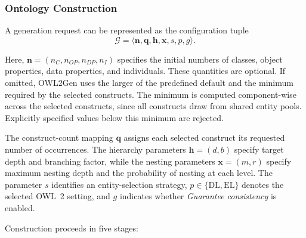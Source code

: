 \subsubsection{Ontology Construction}
\label{sec:owl2gendl}

A generation request can be represented as the configuration tuple
\[
\mathcal{G}
=
\langle \mathbf{n},\mathbf{q},\mathbf{h},\mathbf{x},s,p,g\rangle .
\]

Here, $\mathbf{n}=(n_C,n_{OP},n_{DP},n_I)$ specifies the initial numbers
of classes, object properties, data properties, and individuals. These
quantities are optional. If omitted, OWL2Gen uses the larger of the
predefined default and the minimum required by the selected constructs.
The minimum is computed component-wise across the selected constructs,
since all constructs draw from shared entity pools. Explicitly specified
values below this minimum are rejected.

The construct-count mapping $\mathbf{q}$ assigns each selected construct
its requested number of occurrences. The hierarchy parameters
$\mathbf{h}=(d,b)$ specify target depth and branching factor, while the
nesting parameters $\mathbf{x}=(m,r)$ specify maximum nesting depth and
the probability of nesting at each level. The parameter $s$ identifies an
entity-selection strategy, $p\in\{\mathrm{DL},\mathrm{EL}\}$ denotes the
selected OWL~2 setting, and $g$ indicates whether
\emph{Guarantee consistency} is enabled.

Construction proceeds in five stages:

